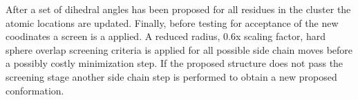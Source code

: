 After a set of dihedral angles has been proposed for all residues in the cluster the atomic locations are updated.
Finally, before testing for acceptance of the new coodinates a screen is a applied.
A reduced radius, 0.6x scaling factor, hard sphere overlap screening criteria is applied for all possible side chain moves before a possibly costly minimization step.
If the proposed structure does not pass the screening stage another side chain step is performed to obtain a new proposed conformation.



